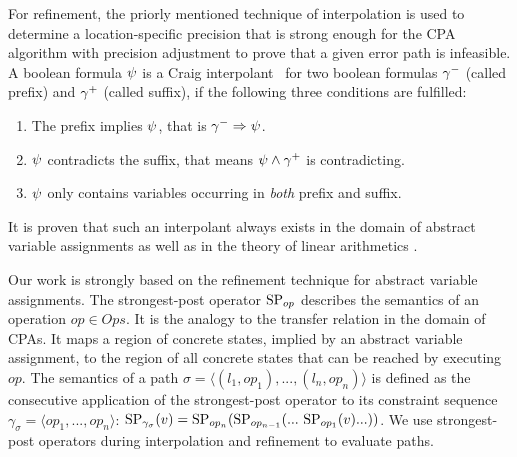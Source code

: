 For refinement, the priorly mentioned technique of interpolation is used to determine a location-specific precision that is strong enough for the CPA algorithm with precision adjustment to prove that a given error path is infeasible.
A boolean formula $\psi$ is a Craig interpolant \cite{Craig1957}\ for two boolean formulas ${\gamma^{-}}$ (called prefix) and ${\gamma^{+}}$ (called suffix), if the following three conditions are fulfilled:
\begin{enumerate}[label=\alph*)]
\item The prefix implies $\psi$, that is ${\gamma^{-}} \Rightarrow \psi$.
\item $\psi$ contradicts the suffix, that means $\psi \wedge {\gamma^{+}}$ is contradicting.
\item $\psi$ only contains variables occurring in \emph{both} prefix and suffix.
\end{enumerate}
It is proven that such an interpolant always exists in the domain of abstract variable assignments \cite{Beyer2013} as well as in the theory of linear arithmetics \cite{Craig1957}.

\label{sec:assignmentRefinement}
Our work is strongly based on the refinement technique for abstract variable assignments.
The strongest-post operator $\text{SP}_{op}$ describes the semantics of an operation $op \in Ops$.
It is the analogy to the transfer relation in the domain of CPAs.
It maps a region of concrete states, implied by an abstract variable assignment, to the region of all concrete states that can be reached by executing $op$.
The semantics of a path $\sigma = \langle (l_1, op_1), ..., (l_n, op_n) \rangle$ is defined as the consecutive application of the strongest-post operator to its constraint sequence $\gamma_\sigma = \langle op_1, ..., op_n \rangle$:
$\strongestPostOp_{\gamma_\sigma}(v) = \strongestPostOp_{op_n}(\strongestPostOp_{op_{n-1}} (...\ \strongestPostOp_{op_1}(v) ... ))$.
We use strongest-post operators during interpolation and refinement to evaluate paths.

